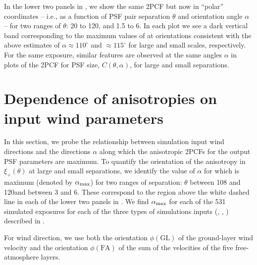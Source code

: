 \documentclass[twocolumn]{aastex631}
\begin{document}
In the lower two panels in , we show the same 2PCF but now in ``polar'' coordinates -- i.e., as a function of PSF pair separation $\theta$ and orientation angle $\alpha$ --  for two ranges of $\theta$: 20 to 120\amin, and 1.5 to 6\amin. 
In each plot we see a dark vertical band corresponding to the maximum values of \xip at orientations consistent with the above estimates of $\alpha\approx 110^\circ$ and $ \approx 115^\circ$ for large and small scales, respectively. 
For the same exposure, similar features are observed at the same angles $\alpha$ in plots of the 2PCF for PSF size, $C(\theta,\alpha)$, for large and small separations. 


\section{Dependence of anisotropies on input wind parameters} \label{sec:inputcompare}

In this section, we probe the relationship between simulation input wind directions and the directions $\alpha$ along which the anisotropic 2PCFs for the output PSF parameters are maximum.
To quantify the orientation of the anisotropy in $\xi_+(\theta)$ at large and small separations, we identify the value of $\alpha$ for which \xip is maximum (denoted by $\alpha_{\rm max}$) for two ranges of separation: $\theta$ between 108 and 120\amin and between 3 and 6\amin. 
These correspond to the region above the white dashed line in each of the lower two panels in . 
We find $\alpha_{\rm max}$ for each of the 531 simulated exposures for each of the three types of simulations inputs (\psfwssims, \bench, \match) described in . 

For wind direction, we use both the orientation $\phi(\text{GL})$ of the ground-layer wind velocity and the orientation $\phi(\text{FA})$ of the sum of the velocities of the five free-atmosphere layers. 
\end{document}
